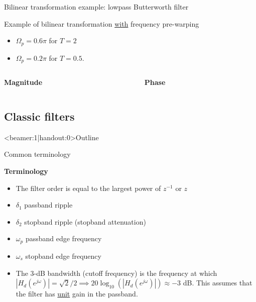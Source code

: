 \documentclass[10pt, handout]{beamer}
\begin{document}
%
\begin{frame}{Bilinear transformation example: lowpass Butterworth filter}

Example of bilinear transformation \underline{with} frequency pre-warping
\begin{itemize}
	\item  $\Omega_p = 0.6\pi$ for $T =2$ 
	\item $\Omega_p = 0.2\pi$ for $T =0.5$.
\end{itemize} 
\vspace{0.25cm}
\begin{columns}
	\begin{column}{0.5\textwidth}
		\textbf{Magnitude}
		\begin{center}
			\resizebox{\linewidth}{!}{}
		\end{center}
	\end{column}
	\begin{column}{0.5\textwidth}
		\textbf{Phase}
		\begin{center}
			\resizebox{\linewidth}{!}{}
		\end{center}
	\end{column}
\end{columns}

\end{frame}

\subsection{Classic filters}
\begin{frame}<beamer:1|handout:0>{Outline}
	\tableofcontents[currentsubsection]
\end{frame}

\begin{frame}{Common terminology}

\begin{center}
	\resizebox{0.55\linewidth}{!}{}
\end{center}

\textbf{Terminology}
\begin{itemize}
	\item The filter order is equal to the largest power of $z^{-1}$ or $z$
	\item $\delta_1$ passband ripple
	\item $\delta_2$ stopband ripple (stopband attenuation)
	\item $\omega_p$ passband edge frequency
	\item $\omega_s$ stopband edge frequency
	\item The 3-dB bandwidth (cutoff frequency) is the frequency at which $|H_d(e^{j\omega})| = \sqrt{2}/2 \implies 20\log_{10}(|H_d(e^{j\omega})|) \approx -3$ dB. This assumes that the filter has \underline{unit} gain in the passband.
\end{itemize}
\end{frame}
\end{document}
